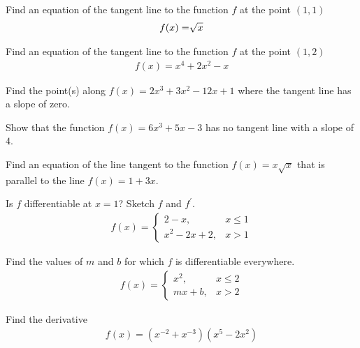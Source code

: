 \begin{exercise}
Find an equation of the tangent line to the function $f$ at the point $(1,1)$
\begin{align*}
    f(x) = \sqrt[\leftroot{2}\uproot{2}]{x}
\end{align*}
\end{exercise}

\begin{exercise}
Find an equation of the tangent line to the function $f$ at the point $(1,2)$
\begin{align*}
    f(x) = x^{4} + 2x^{2} - x
\end{align*}
\end{exercise}

\begin{exercise}
Find the point(s) along $f(x) = 2x^{3} + 3x^{2} -12x + 1$ where the tangent line has a slope of zero. 
\end{exercise}

\begin{exercise}
Show that the function $f(x) = 6x^{3} + 5x - 3$ has no tangent line with a slope of $4$.
\end{exercise}

\begin{exercise}
Find an equation of the line tangent to the function $f(x) = x\sqrt{x}$ that is parallel to the line $f(x) = 1 + 3x$.
\end{exercise}

\begin{exercise}
Is $f$ differentiable at $x=1$? Sketch $f$ and $f^{'}$.
\begin{align*}
    f(x) = \begin{cases}
    2-x, &x\leq 1\\[2ex]
    x^{2} - 2x + 2, &x> 1
    \end{cases}
\end{align*}
\end{exercise}

\begin{exercise}
Find the values of $m$ and $b$ for which $f$ is differentiable everywhere.
\begin{align*}
    f(x) = \begin{cases}
    x^{2}, &x\leq 2\\[2ex]
    mx + b, &x>2
    \end{cases}
\end{align*}
\end{exercise}

\begin{exercise}
Find the derivative
\begin{align*}
    f(x) = (x^{-2} + x^{-3})(x^{5} - 2x^{2})
\end{align*}
\end{exercise}

